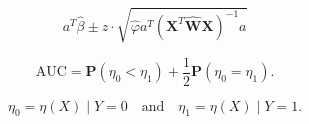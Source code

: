 \[
  a^T\hat{\beta} \pm z \cdot \sqrt{\hat{\varphi} a^T(\mathbf{X}^T\hat{\mathbf{W}}\mathbf{X})^{-1}a}
\]

\[
  \mathrm{AUC} = \mathbf{P}(\eta_0 < \eta_1) + \frac{1}{2} \mathbf{P}(\eta_0 = \eta_1).
\]

\[
  \eta_0 = \eta(X) \mid Y = 0 \quad \text{and} \quad \eta_1 = \eta(X) \mid Y = 1.
\]
